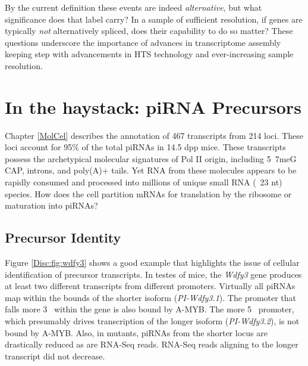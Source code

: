     By the current definition these events are indeed \textit{alternative}, but what significance does that label carry? In a sample of sufficient resolution, if genes are typically \textit{not} alternatively spliced, does their capability to do so matter? These questions underscore the importance of advances in transcriptome assembly keeping step with advancements in HTS technology and ever-increasing sample resolution.

\section{In the haystack: piRNA Precursors}
  \label{Disc:sec:piRNA precursors}

  Chapter \ref{MolCel} describes the annotation of 467 transcripts from 214 loci. These loci account for 95\% of the total piRNAs in 14.5 dpp mice. These transcripts possess the archetypical molecular signatures of Pol II origin, including 5\textprime~7meG CAP, introns, and poly(A)+ tails. Yet RNA from these molecules appears to be rapidly consumed and processed into millions of unique small RNA (~23 nt) species. How does the cell partition mRNAs for translation by the ribosome or maturation into piRNAs?

  \subsection{Precursor Identity}
    \label{Disc:subsec:How are precursors generated}

    Figure \ref{Disc:fig:wdfy3} shows a good example that highlights the issue of cellular identification of precursor transcripts. In testes of mice, the \textit{Wdfy3} gene produces at least two different transcripts from different promoters. Virtually all piRNAs map within the bounds of the shorter isoform (\textit{PI-Wdfy3.1}). The promoter that falls more 3\textprime~ within the gene is also bound by A-MYB. The more 5\textprime~ promoter, which presumably drives transcription of the longer isoform (\textit{PI-Wdfy3.2}), is not bound by A-MYB. Also, in \amyb{} mutants, piRNAs from the shorter locus are drastically reduced as are RNA-Seq reads. RNA-Seq reads aligning to the longer transcript did not decrease.

